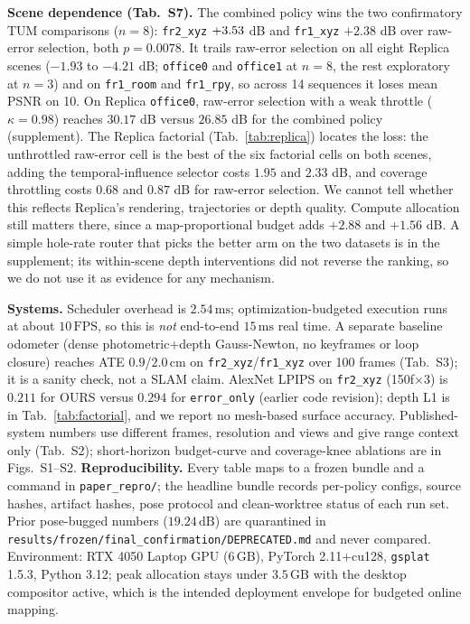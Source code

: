 \textbf{Scene dependence (Tab.~S7).}
The combined policy wins the two confirmatory TUM comparisons ($n=8$): \texttt{fr2\_xyz} $+3.53$ dB and \texttt{fr1\_xyz} $+2.38$ dB over raw-error selection, both $p=0.0078$. It trails raw-error selection on all eight Replica scenes ($-1.93$ to $-4.21$ dB; \texttt{office0} and \texttt{office1} at $n=8$, the rest exploratory at $n=3$) and on \texttt{fr1\_room} and \texttt{fr1\_rpy}, so across 14 sequences it loses mean PSNR on 10.
On Replica \texttt{office0}, raw-error selection with a weak throttle ($\kappa=0.98$) reaches $30.17$ dB versus $26.85$ dB for the combined policy (supplement). The Replica factorial (Tab.~\ref{tab:replica}) locates the loss: the unthrottled raw-error cell is the best of the six factorial cells on both scenes, adding the temporal-influence selector costs $1.95$ and $2.33$ dB, and coverage throttling costs $0.68$ and $0.87$ dB for raw-error selection. We cannot tell whether this reflects Replica's rendering, trajectories or depth quality. Compute allocation still matters there, since a map-proportional budget adds $+2.88$ and $+1.56$ dB. A simple hole-rate router that picks the better arm on the two datasets is in the supplement; its within-scene depth interventions did not reverse the ranking, so we do not use it as evidence for any mechanism.



\textbf{Systems.} Scheduler overhead is $2.54\,\mathrm{ms}$; optimization-budgeted execution runs at about $10\,\mathrm{FPS}$, so this is \emph{not} end-to-end $15\,\mathrm{ms}$ real time.
A separate baseline odometer (dense photometric+depth Gauss-Newton, no keyframes or loop closure) reaches ATE $0.9$/$2.0\,\mathrm{cm}$ on \texttt{fr2\_xyz}/\texttt{fr1\_xyz} over 100 frames (Tab.~S3); it is a sanity check, not a SLAM claim.
AlexNet LPIPS on \texttt{fr2\_xyz} (150f$\times$3) is $0.211$ for OURS versus $0.294$ for \texttt{error\_only} (earlier code revision); depth L1 is in Tab.~\ref{tab:factorial}, and we report no mesh-based surface accuracy.
Published-system numbers use different frames, resolution and views and give range context only (Tab.~S2); short-horizon budget-curve and coverage-knee ablations are in Figs.~S1--S2.
\textbf{Reproducibility.} Every table maps to a frozen bundle and a command in \texttt{paper\_repro/}; the headline bundle records per-policy configs, source hashes, artifact hashes, pose protocol and clean-worktree status of each run set. Prior pose-bugged numbers ($19.24\,\mathrm{dB}$) are quarantined in \texttt{results/frozen/final\_confirmation/DEPRECATED.md} and never compared.
Environment: RTX 4050 Laptop GPU (6\,GB), PyTorch 2.11+cu128, \texttt{gsplat}~\cite{ye2025gsplat} 1.5.3, Python 3.12; peak allocation stays under $3.5\,\mathrm{GB}$ with the desktop compositor active, which is the intended deployment envelope for budgeted online mapping.







